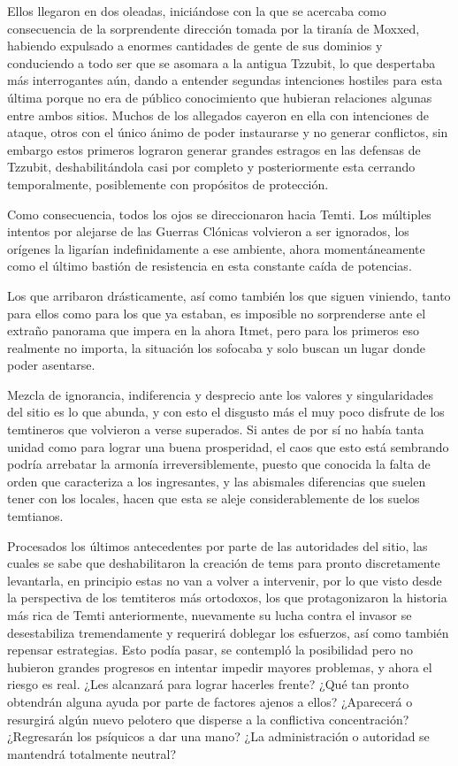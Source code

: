\documentclass[
  spanish,
]{book}
\begin{document}
Ellos llegaron en dos oleadas, iniciándose con la que se acercaba como consecuencia de la sorprendente dirección tomada por la tiranía de Moxxed, habiendo expulsado a enormes cantidades de gente de sus dominios y conduciendo a todo ser que se asomara a la antigua Tzzubit, lo que despertaba más interrogantes aún, dando a entender segundas intenciones hostiles para esta última porque no era de público conocimiento que hubieran relaciones algunas entre ambos sitios. Muchos de los allegados cayeron en ella con intenciones de ataque, otros con el único ánimo de poder instaurarse y no generar conflictos, sin embargo estos primeros lograron generar grandes estragos en las defensas de Tzzubit, deshabilitándola casi por completo y posteriormente esta cerrando temporalmente, posiblemente con propósitos de protección.

Como consecuencia, todos los ojos se direccionaron hacia Temti. Los múltiples intentos por alejarse de las Guerras Clónicas volvieron a ser ignorados, los orígenes la ligarían indefinidamente a ese ambiente, ahora momentáneamente como el último bastión de resistencia en esta constante caída de potencias.

Los que arribaron drásticamente, así como también los que siguen viniendo, tanto para ellos como para los que ya estaban, es imposible no sorprenderse ante el extraño panorama que impera en la ahora Itmet, pero para los primeros eso realmente no importa, la situación los sofocaba y solo buscan un lugar donde poder asentarse.

Mezcla de ignorancia, indiferencia y desprecio ante los valores y singularidades del sitio es lo que abunda, y con esto el disgusto más el muy poco disfrute de los temtineros que volvieron a verse superados. Si antes de por sí no había tanta unidad como para lograr una buena prosperidad, el caos que esto está sembrando podría arrebatar la armonía irreversiblemente, puesto que conocida la falta de orden que caracteriza a los ingresantes, y las abismales diferencias que suelen tener con los locales, hacen que esta se aleje considerablemente de los suelos temtianos.

Procesados los últimos antecedentes por parte de las autoridades del sitio, las cuales se sabe que deshabilitaron la creación de tems para pronto discretamente levantarla, en principio estas no van a volver a intervenir, por lo que visto desde la perspectiva de los temtiteros más ortodoxos, los que protagonizaron la historia más rica de Temti anteriormente, nuevamente su lucha contra el invasor se desestabiliza tremendamente y requerirá doblegar los esfuerzos, así como también repensar estrategias. Esto podía pasar, se contempló la posibilidad pero no hubieron grandes progresos en intentar impedir mayores problemas, y ahora el riesgo es real. ¿Les alcanzará para lograr hacerles frente? ¿Qué tan pronto obtendrán alguna ayuda por parte de factores ajenos a ellos? ¿Aparecerá o resurgirá algún nuevo pelotero que disperse a la conflictiva concentración? ¿Regresarán los psíquicos a dar una mano? ¿La administración o autoridad se mantendrá totalmente neutral?
\end{document}
